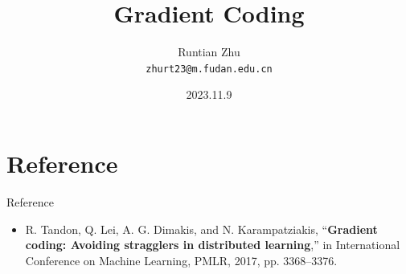 \documentclass{beamer}
\title{Gradient Coding}
\author{Runtian Zhu \\ \texttt{zhurt23@m.fudan.edu.cn}}
\date{2023.11.9}
\begin{document}
\captionsetup[figure]{labelformat=empty}

\begin{frame}
  \titlepage
\end{frame}

\section{Reference}

\begin{frame}{Reference}

\begin{itemize}
    \item R. Tandon, Q. Lei, A. G. Dimakis, and N. Karampatziakis, “\textbf{Gradient coding: Avoiding stragglers in distributed learning},” in International Conference on Machine Learning, PMLR, 2017, pp. 3368–3376.
\end{itemize}


\end{frame}
\end{document}
